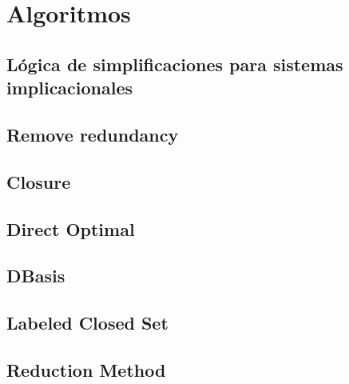 \section{Algoritmos}

\subsection{L\'ogica de simplificaciones para sistemas implicacionales}

 
\newpage

\subsection{Remove redundancy}

 
\newpage

\subsection{Closure}

 
\newpage

\subsection{Direct Optimal}

 
\newpage

\subsection{DBasis}

 
\newpage

\subsection{Labeled Closed Set}

 
\newpage

\subsection{Reduction Method}

 

\newpage
\thispagestyle{empty}
\mbox{}

\newpage